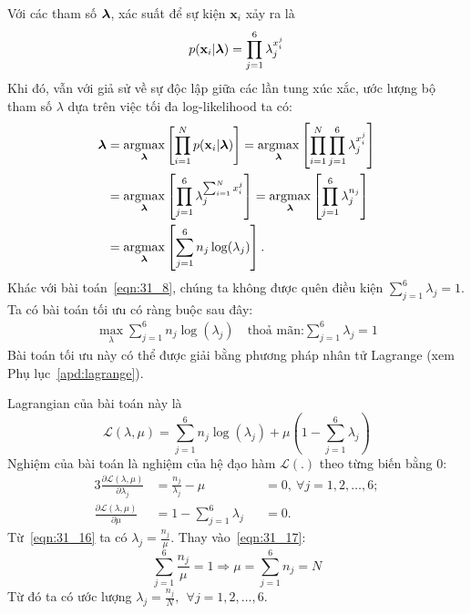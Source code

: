 Với các tham số $\boldsymbol{\lambda}$, xác suất để sự kiện $\mathbf{x}_i$ xảy ra là
\begin{eqnarray}
p(\mathbf{x}_i | \boldsymbol{\lambda}) = \prod_{j = 1}^6 \lambda_j^{x_i^j}
\end{eqnarray}
Khi đó, vẫn với giả sử về sự độc lập giữa các lần tung xúc xắc, ước lượng bộ
tham số $\lambda$ dựa trên việc tối đa log-likelihood ta có:
\begin{align}
\label{eqn:31_10}
\boldsymbol{\lambda} & =  \operatorname*{argmax}_{\boldsymbol{\lambda}} \left[ \prod_{i=1}^N p(\mathbf{x}_i |
\boldsymbol{\lambda}) \right]
=  \operatorname*{argmax}_{\boldsymbol{\lambda}} \left[ \prod_{i=1}^N  \prod_{j = 1}^6 \lambda_j^{x_i^j} \right]  \\\
\label{eqn:31_12}
& =  \operatorname*{argmax}_{\boldsymbol{\lambda}} \left[  \prod_{j = 1}^6 \lambda_j^{\sum_{i=1}^N x_i^j} \right]
=  \operatorname*{argmax}_{\boldsymbol{\lambda}} \left[  \prod_{j = 1}^6 \lambda_j^{n_j} \right]  \\\
\label{eqn:31_14}
& =  \operatorname*{argmax}_{\boldsymbol{\lambda}} \left[  \sum_{j=1}^6 n_j\log(\lambda_j) \right].
\end{align}
Khác với bài toán~\eqref{eqn:31_8}, chúng ta không được quên điều kiện
$\sum_{j=1}^6 \lambda_j = 1$. Ta có bài toán tối ưu có ràng buộc sau đây:
\begin{equation}
\label{eqn:31_15}
\begin{aligned}
\max_{\lambda}  \sum_{j=1}^6 n_j\log(\lambda_j) \quad
\text{thoả mãn:}  \sum_{j=1}^6 \lambda_j = 1
\end{aligned}
\end{equation}
Bài toán tối ưu này có thể được giải bằng phương pháp nhân tử Lagrange (xem Phụ
lục~\ref{apd:lagrange}).

Lagrangian của bài toán này là
\begin{equation}
\mathcal{L}(\lambda, \mu) = \sum_{j=1}^6 n_j\log(\lambda_j) + \mu (1- \sum_{j=1}^6 \lambda_j)
\end{equation}
Nghiệm của bài toán là nghiệm của hệ đạo hàm $\mathcal{L}(.)$ theo từng biến bằng 0:
\begin{alignat}{3}
\label{eqn:31_16}
\frac{\partial \mathcal{L}(\lambda, \mu)}{\partial \lambda_j} &=   \frac{n_j}{\lambda_j} - \mu &&=  0,~ \forall j = 1, 2, \dots, 6;\\
\label{eqn:31_17}
\frac{\partial \mathcal{L}(\lambda, \mu)}{\partial \mu} &=  1-\sum_{j=1}^6 \lambda_j &&= 0.
\end{alignat}
Từ~\eqref{eqn:31_16} ta có $\lambda_j = \frac{n_j}{\mu}$. Thay
vào~\eqref{eqn:31_17}:
\begin{equation}
\sum_{j=1}^6 \frac{n_j}{\mu} = 1 \Rightarrow \mu = \sum_{j=1}^6 n_j = N
\end{equation}
Từ đó ta có ước lượng
$\lambda_j = \frac{n_j}{N}, ~~\forall j = 1, 2, \dots, 6$.

